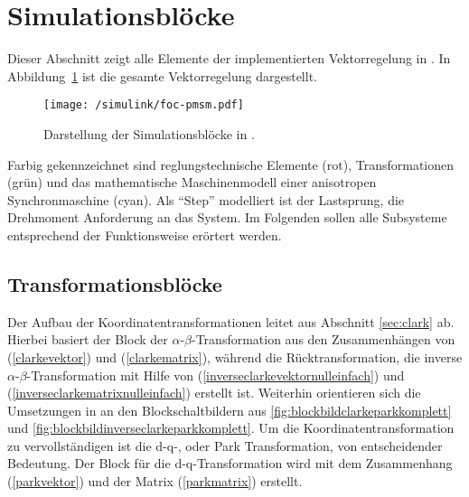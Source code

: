 

\section{Simulationsblöcke}\label{sec:math-model-pmsm}

Dieser Abschnitt zeigt alle Elemente der implementierten Vektorregelung in  .
In Abbildung~\ref{fig:foc-pmsm} ist die gesamte Vektorregelung dargestellt.

\newpage

\begin{figure}[h!]
	\texttt{[image: /simulink/foc-pmsm.pdf]}
	\label{fig:foc-pmsm}
	\caption{Darstellung der Simulationsblöcke in .}
\end{figure}

Farbig gekennzeichnet sind reglungstechnische Elemente (rot), Transformationen (grün) und das mathematische Maschinenmodell einer anisotropen Synchronmaschine (cyan).
Als \enquote{Step} modelliert ist der Lastsprung, die Drehmoment Anforderung an das System.
Im Folgenden sollen alle Subsysteme entsprechend der Funktionsweise erörtert werden.

\subsection{Transformationsblöcke}

Der Aufbau der Koordinatentransformationen leitet aus Abschnitt \ref{sec:clark} ab. 
Hierbei basiert der Block der $\alpha$-$\beta$-Transformation aus den Zusammenhängen von (\ref{clarkevektor}) und (\ref{clarkematrix}), während die Rücktransformation, die inverse $\alpha$-$\beta$-Transformation mit Hilfe von (\ref{inverseclarkevektornulleinfach}) und (\ref{inverseclarkematrixnulleinfach}) erstellt ist.
Weiterhin orientieren sich die Umsetzungen in  an den Blockschaltbildern aus \ref{fig:blockbildclarkeparkkomplett} und \ref{fig:blockbildinverseclarkeparkkomplett}.
Um die Koordinatentransformation zu vervollständigen ist die d-q-, oder Park Transformation, von entscheidender Bedeutung.
Der Block für die d-q-Transformation wird mit dem Zusammenhang (\ref{parkvektor}) und der Matrix (\ref{parkmatrix}) erstellt. 

